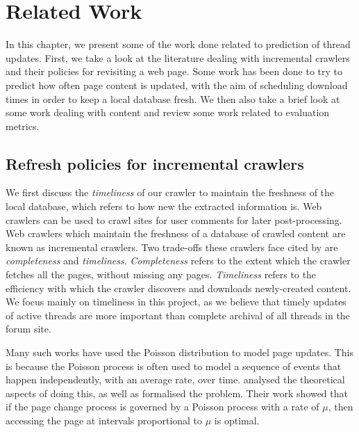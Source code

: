 \chapter{Related Work}
In this chapter, we present some of the work done related to prediction of 
thread updates. First, we take a look at the literature dealing with incremental 
crawlers and their policies for revisiting a web page. Some work has been done 
to try to predict how often page content is updated, with the aim of scheduling 
download times in order to keep a local database fresh. We then also take a 
brief look at some work dealing with content and review some work related 
to evaluation metrics.

 


\section{Refresh policies for incremental crawlers}

We first discuss the \emph{timeliness} of our crawler to maintain the freshness 
of the local database, which refers to how new the extracted information is. Web 
crawlers can be used to crawl sites for user comments for 
later post-processing. Web crawlers which maintain the freshness of a database of 
crawled content are known as incremental crawlers. Two trade-offs these crawlers 
face cited by  are \emph{completeness} and \emph{timeliness}.  
\emph{Completeness} refers to the extent which the crawler fetches all the 
pages, without missing any pages. \emph{Timeliness} refers to the efficiency 
with which the crawler discovers and downloads newly-created content. We focus 
mainly on timeliness in this project, as we believe that timely updates of 
active threads are more important than complete archival of all threads in the 
forum site.

Many such works have used the Poisson distribution to model page updates.  This 
is because the Poisson process is often used to model a sequence of events that 
happen independently, with an average rate, over time.   
analysed the theoretical aspects of doing this, as well as formalised the 
problem. Their work showed that if the page change process is governed by a 
Poisson process with a rate of $\mu$, then accessing the page at intervals 
proportional to $\mu$ is optimal.

